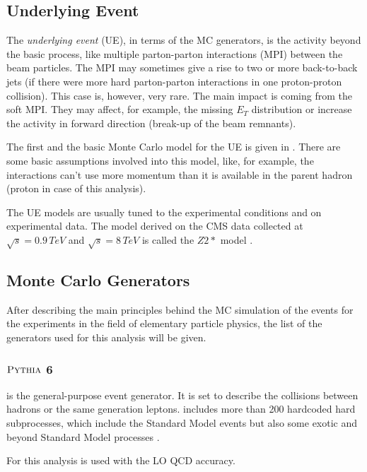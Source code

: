 \subsection{Underlying Event}

The \textit{underlying event} (UE), in terms of the MC generators, is the activity beyond the basic process, like multiple parton-parton interactions
(MPI) between the beam particles. The MPI may sometimes give a rise to two or more back-to-back jets (if there were more hard parton-parton interactions
in one proton-proton collision). This case is, however, very rare. The main impact is coming from the soft MPI. They may affect, for example, the 
missing $E_{T}$ distribution or increase the activity in forward direction (break-up of the beam remnants).

The first and the basic Monte Carlo model for the UE is given in \cite{PhysRevD.36.2019}. There are some basic assumptions involved into
this model, like, for example, the interactions can't use more momentum than it is available in the parent hadron (proton in case of this analysis).

The UE models are usually tuned to the experimental conditions and on experimental data. The model derived on the CMS data collected at $\sqrt{s} = 0.9\, TeV$
and $\sqrt{s} = 8\,TeV$ is called the $Z2*$ model \cite{Chatrchyan:2011id}.


\subsection{Monte Carlo Generators}

After describing the main principles behind the MC simulation of the events for the experiments in the field of elementary particle
physics, the list of the generators used for this analysis will be given.

\subsubsection{$\textsc{Pythia}$ 6}

\PYTHIA \cite{Sjostrand:2006za} is the general-purpose event generator. It is set to describe the collisions between hadrons
or the same generation leptons. \PYTHIA includes more than 200 hardcoded
hard subprocesses, which include the Standard Model events but also some exotic and beyond Standard Model processes \cite{Buckley:2011ms}.

For this analysis \PYTHIA is used with the LO QCD accuracy.

